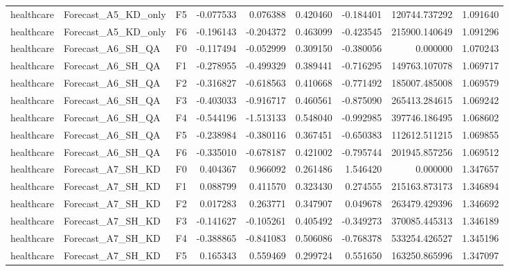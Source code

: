 \begin{tabular}{lllrrrrrr}
healthcare &          Forecast\_A5\_KD\_only &  F5 & -0.077533 &  0.076388 & 0.420460 & -0.184401 &    120744.737292 &             1.091640 \\
healthcare &          Forecast\_A5\_KD\_only &  F6 & -0.196143 & -0.204372 & 0.463099 & -0.423545 &    215900.140649 &             1.091296 \\
healthcare &            Forecast\_A6\_SH\_QA &  F0 & -0.117494 & -0.052999 & 0.309150 & -0.380056 &         0.000000 &             1.070243 \\
healthcare &            Forecast\_A6\_SH\_QA &  F1 & -0.278955 & -0.499329 & 0.389441 & -0.716295 &    149763.107078 &             1.069717 \\
healthcare &            Forecast\_A6\_SH\_QA &  F2 & -0.316827 & -0.618563 & 0.410668 & -0.771492 &    185007.485008 &             1.069579 \\
healthcare &            Forecast\_A6\_SH\_QA &  F3 & -0.403033 & -0.916717 & 0.460561 & -0.875090 &    265413.284615 &             1.069242 \\
healthcare &            Forecast\_A6\_SH\_QA &  F4 & -0.544196 & -1.513133 & 0.548040 & -0.992985 &    397746.186495 &             1.068602 \\
healthcare &            Forecast\_A6\_SH\_QA &  F5 & -0.238984 & -0.380116 & 0.367451 & -0.650383 &    112612.511215 &             1.069855 \\
healthcare &            Forecast\_A6\_SH\_QA &  F6 & -0.335010 & -0.678187 & 0.421002 & -0.795744 &    201945.857256 &             1.069512 \\
healthcare &            Forecast\_A7\_SH\_KD &  F0 &  0.404367 &  0.966092 & 0.261486 &  1.546420 &         0.000000 &             1.347657 \\
healthcare &            Forecast\_A7\_SH\_KD &  F1 &  0.088799 &  0.411570 & 0.323430 &  0.274555 &    215163.873173 &             1.346894 \\
healthcare &            Forecast\_A7\_SH\_KD &  F2 &  0.017283 &  0.263771 & 0.347907 &  0.049678 &    263479.429396 &             1.346692 \\
healthcare &            Forecast\_A7\_SH\_KD &  F3 & -0.141627 & -0.105261 & 0.405492 & -0.349273 &    370085.445313 &             1.346189 \\
healthcare &            Forecast\_A7\_SH\_KD &  F4 & -0.388865 & -0.841083 & 0.506086 & -0.768378 &    533254.426527 &             1.345196 \\
healthcare &            Forecast\_A7\_SH\_KD &  F5 &  0.165343 &  0.559469 & 0.299724 &  0.551650 &    163250.865996 &             1.347097 \\

\end{tabular}
